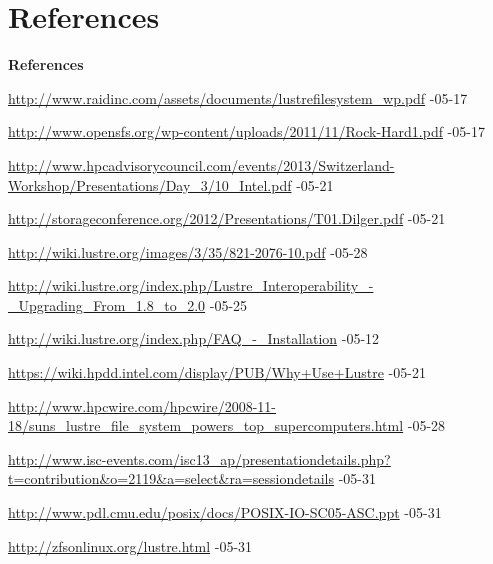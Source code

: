 \section{References}

\begin{frame}{\textbf{References}}
    \tiny
    \begin{thebibliography}{1}
        \beamertemplatetextbibitems

            \url{http://www.raidinc.com/assets/documents/lustrefilesystem_wp.pdf} -05-17

            \url{http://www.opensfs.org/wp-content/uploads/2011/11/Rock-Hard1.pdf} -05-17

            \url{http://www.hpcadvisorycouncil.com/events/2013/Switzerland-Workshop/Presentations/Day_3/10_Intel.pdf} -05-21

            \url{http://storageconference.org/2012/Presentations/T01.Dilger.pdf} -05-21

            \url{http://wiki.lustre.org/images/3/35/821-2076-10.pdf} -05-28

            \url{http://wiki.lustre.org/index.php/Lustre_Interoperability_-_Upgrading_From_1.8_to_2.0} -05-25

            \url{http://wiki.lustre.org/index.php/FAQ_-_Installation} -05-12

            \url{https://wiki.hpdd.intel.com/display/PUB/Why+Use+Lustre} -05-21

            \url{http://www.hpcwire.com/hpcwire/2008-11-18/suns_lustre_file_system_powers_top_supercomputers.html} -05-28

            \url{http://www.isc-events.com/isc13_ap/presentationdetails.php?t=contribution&o=2119&a=select&ra=sessiondetails} -05-31

            \url{http://www.pdl.cmu.edu/posix/docs/POSIX-IO-SC05-ASC.ppt} -05-31

            \url{http://zfsonlinux.org/lustre.html} -05-31

    \end{thebibliography}
\end{frame}
